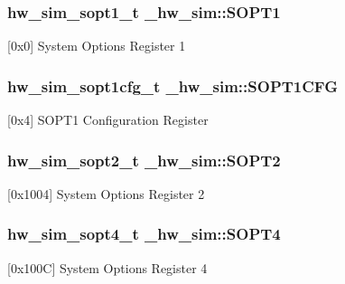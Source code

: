 \subsubsection[{\texorpdfstring{S\+O\+P\+T1}{SOPT1}}]{ {\bf hw\+\_\+sim\+\_\+sopt1\+\_\+t} \+\_\+hw\+\_\+sim\+::\+S\+O\+P\+T1}\hypertarget{struct__hw__sim_a8454ab0e35dbadf532fb430d5c99ab0d}{}\label{struct__hw__sim_a8454ab0e35dbadf532fb430d5c99ab0d}
\mbox{[}0x0\mbox{]} System Options Register 1 
\subsubsection[{\texorpdfstring{S\+O\+P\+T1\+C\+FG}{SOPT1CFG}}]{ {\bf hw\+\_\+sim\+\_\+sopt1cfg\+\_\+t} \+\_\+hw\+\_\+sim\+::\+S\+O\+P\+T1\+C\+FG}\hypertarget{struct__hw__sim_afd7a6126f3c93303400048240cdaa56d}{}\label{struct__hw__sim_afd7a6126f3c93303400048240cdaa56d}
\mbox{[}0x4\mbox{]} S\+O\+P\+T1 Configuration Register 
\subsubsection[{\texorpdfstring{S\+O\+P\+T2}{SOPT2}}]{ {\bf hw\+\_\+sim\+\_\+sopt2\+\_\+t} \+\_\+hw\+\_\+sim\+::\+S\+O\+P\+T2}\hypertarget{struct__hw__sim_afd7e47c57ddc31b815cf5b3ad2396351}{}\label{struct__hw__sim_afd7e47c57ddc31b815cf5b3ad2396351}
\mbox{[}0x1004\mbox{]} System Options Register 2 
\subsubsection[{\texorpdfstring{S\+O\+P\+T4}{SOPT4}}]{ {\bf hw\+\_\+sim\+\_\+sopt4\+\_\+t} \+\_\+hw\+\_\+sim\+::\+S\+O\+P\+T4}\hypertarget{struct__hw__sim_a8d2ab8044468a90fd36dbecd77cf8894}{}\label{struct__hw__sim_a8d2ab8044468a90fd36dbecd77cf8894}
\mbox{[}0x100C\mbox{]} System Options Register 4 
